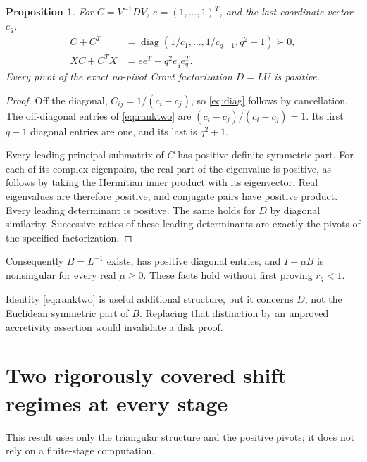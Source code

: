 \documentclass[11pt,letterpaper]{article}
\newtheorem{proposition}[theorem]{Proposition}
\begin{document}
\begin{proposition}\label{prop:ranktwo}
For $C=V^{-1}DV$, $e=(1,\ldots,1)^T$, and the last coordinate vector $e_q$,
\begin{align}
 C+C^T&=\operatorname{diag}(1/c_1,\ldots,1/c_{q-1},q^2+1)\succ0,\label{eq:diag}\\
 XC+C^TX&=ee^T+q^2e_qe_q^T.\label{eq:ranktwo}
\end{align}
Every pivot of the exact no-pivot Crout factorization $D=LU$ is positive.
\end{proposition}
\begin{proof}
Off the diagonal, $C_{ij}=1/(c_i-c_j)$, so \eqref{eq:diag} follows by
cancellation. The off-diagonal entries of \eqref{eq:ranktwo} are
$(c_i-c_j)/(c_i-c_j)=1$. Its first $q-1$ diagonal entries are one, and
its last is $q^2+1$.

Every leading principal submatrix of $C$ has positive-definite symmetric
part. For each of its complex eigenpairs, the real part of the eigenvalue
is positive, as follows by taking the Hermitian inner product with its
eigenvector. Real eigenvalues are therefore positive, and conjugate pairs
have positive product. Every leading determinant is positive. The same
holds for $D$ by diagonal similarity. Successive ratios of these leading
determinants are exactly the pivots of the specified factorization.
\end{proof}

Consequently $B=L^{-1}$ exists, has positive diagonal entries, and
$I+\mu B$ is nonsingular for every real $\mu\ge0$. These facts hold
without first proving $r_q<1$.

Identity \eqref{eq:ranktwo} is useful additional structure, but it concerns
$D$, not the Euclidean symmetric part of $B$. Replacing that distinction
by an unproved accretivity assertion would invalidate a disk proof.

\newpage
\section{Two rigorously covered shift regimes at every stage}
This result uses only the triangular structure and the positive pivots;
it does not rely on a finite-stage computation.
\end{document}
